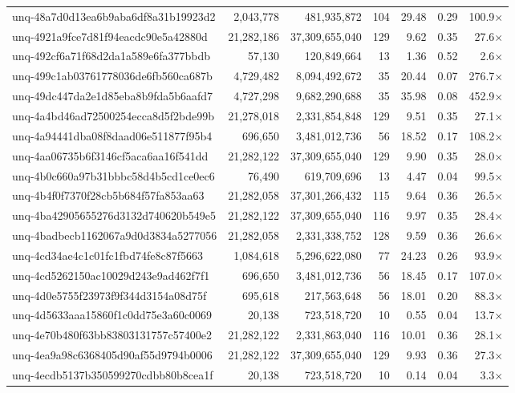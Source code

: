 \begin{table}[h!]
\begin{tabular}{lrrrrrr}
unq-48a7d0d13ea6b9aba6df8a31b19923d2 & 2,043,778 & 481,935,872 & 104 & 29.48 & 0.29 & 100.9$\times$ \\
unq-4921a9fce7d81f94eacdc90e5a42880d & 21,282,186 & 37,309,655,040 & 129 & 9.62 & 0.35 & 27.6$\times$ \\
unq-492cf6a71f68d2da1a589e6fa377bbdb & 57,130 & 120,849,664 & 13 & 1.36 & 0.52 & 2.6$\times$ \\
unq-499c1ab03761778036de6fb560ca687b & 4,729,482 & 8,094,492,672 & 35 & 20.44 & 0.07 & 276.7$\times$ \\
unq-49dc447da2e1d85eba8b9fda5b6aafd7 & 4,727,298 & 9,682,290,688 & 35 & 35.98 & 0.08 & 452.9$\times$ \\
unq-4a4bd46ad72500254ecca8d5f2bde99b & 21,278,018 & 2,331,854,848 & 129 & 9.51 & 0.35 & 27.1$\times$ \\
unq-4a94441dba08f8daad06e511877f95b4 & 696,650 & 3,481,012,736 & 56 & 18.52 & 0.17 & 108.2$\times$ \\
unq-4aa06735b6f3146cf5aca6aa16f541dd & 21,282,122 & 37,309,655,040 & 129 & 9.90 & 0.35 & 28.0$\times$ \\
unq-4b0c660a97b31bbbc58d4b5cd1ce0ec6 & 76,490 & 619,709,696 & 13 & 4.47 & 0.04 & 99.5$\times$ \\
unq-4b4f0f7370f28cb5b684f57fa853aa63 & 21,282,058 & 37,301,266,432 & 115 & 9.64 & 0.36 & 26.5$\times$ \\
unq-4ba42905655276d3132d740620b549e5 & 21,282,122 & 37,309,655,040 & 116 & 9.97 & 0.35 & 28.4$\times$ \\
unq-4badbecb1162067a9d0d3834a5277056 & 21,282,058 & 2,331,338,752 & 128 & 9.59 & 0.36 & 26.6$\times$ \\
unq-4cd34ae4c1c01fc1fbd74fe8c87f5663 & 1,084,618 & 5,296,622,080 & 77 & 24.23 & 0.26 & 93.9$\times$ \\
unq-4cd5262150ac10029d243e9ad462f7f1 & 696,650 & 3,481,012,736 & 56 & 18.45 & 0.17 & 107.0$\times$ \\
unq-4d0e5755f23973f9f344d3154a08d75f & 695,618 & 217,563,648 & 56 & 18.01 & 0.20 & 88.3$\times$ \\
unq-4d5633aaa15860f1c0dd75e3a60c0069 & 20,138 & 723,518,720 & 10 & 0.55 & 0.04 & 13.7$\times$ \\
unq-4e70b480f63bb83803131757c57400e2 & 21,282,122 & 2,331,863,040 & 116 & 10.01 & 0.36 & 28.1$\times$ \\
unq-4ea9a98c6368405d90af55d9794b0006 & 21,282,122 & 37,309,655,040 & 129 & 9.93 & 0.36 & 27.3$\times$ \\
unq-4ecdb5137b350599270cdbb80b8cea1f & 20,138 & 723,518,720 & 10 & 0.14 & 0.04 & 3.3$\times$ \\

\end{tabular}
\end{table}
